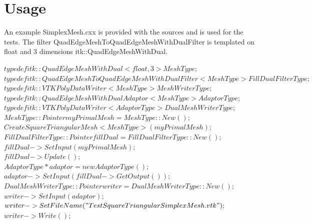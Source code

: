 \documentclass{InsightArticle}
\begin{document}
\section{Usage}
An example SimplexMesh.cxx is provided with the sources and is used for the tests. The filter QuadEdgeMeshToQuadEdgeMeshWithDualFilter is templated on float and 3 dimensions itk::QuadEdgeMeshWithDual. 

  $typedef itk::QuadEdgeMeshWithDual< float, 3 > MeshType;$ \\
  $typedef itk::QuadEdgeMeshToQuadEdgeMeshWithDualFilter< MeshType >  FillDualFilterType; $\\

  $typedef itk::VTKPolyDataWriter< MeshType > MeshWriterType;$\\
  $typedef itk::QuadEdgeMeshWithDualAdaptor< MeshType >  AdaptorType;$\\
  $typedef itk::VTKPolyDataWriter< AdaptorType > DualMeshWriterType;$\\

  $MeshType::Pointer myPrimalMesh = MeshType::New();$\\
  $CreateSquareTriangularMesh< MeshType >( myPrimalMesh );$\\

  $FillDualFilterType::Pointer fillDual = FillDualFilterType::New();$\\
  $fillDual->SetInput( myPrimalMesh );$\\
  $fillDual->Update( );$\\

  $AdaptorType* adaptor = new AdaptorType();$\\
  $adaptor->SetInput( fillDual->GetOutput() );$\\

  $DualMeshWriterType::Pointer writer = DualMeshWriterType::New();$\\
  $writer->SetInput( adaptor );$\\
  $writer->SetFileName( "TestSquareTriangularSimplexMesh.vtk" );$\\
  $writer->Write();$\\


\end{document}
